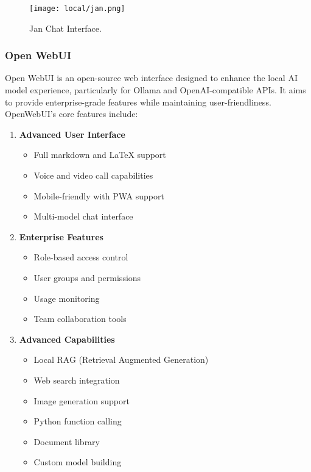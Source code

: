 \begin{figure}[H]
\centering
\texttt{[image: local/jan.png]}
\caption{Jan Chat Interface.}
\label{fig:jan}
\end{figure}

\subsubsection{Open WebUI}

Open WebUI is an open-source web interface designed to enhance the local AI model experience, particularly for Ollama and OpenAI-compatible APIs. It aims to provide enterprise-grade features while maintaining user-friendliness. OpenWebUI's core features include:

\begin{enumerate}
\item \textbf{Advanced User Interface}
   \begin{itemize}
   \item Full markdown and LaTeX support
   \item Voice and video call capabilities
   \item Mobile-friendly with PWA support
   \item Multi-model chat interface
   \end{itemize}

\item \textbf{Enterprise Features}
   \begin{itemize}
   \item Role-based access control
   \item User groups and permissions
   \item Usage monitoring
   \item Team collaboration tools
   \end{itemize}

\item \textbf{Advanced Capabilities}
   \begin{itemize}
   \item Local RAG (Retrieval Augmented Generation)
   \item Web search integration
   \item Image generation support
   \item Python function calling
   \item Document library
   \item Custom model building
   \end{itemize}
\end{enumerate}

